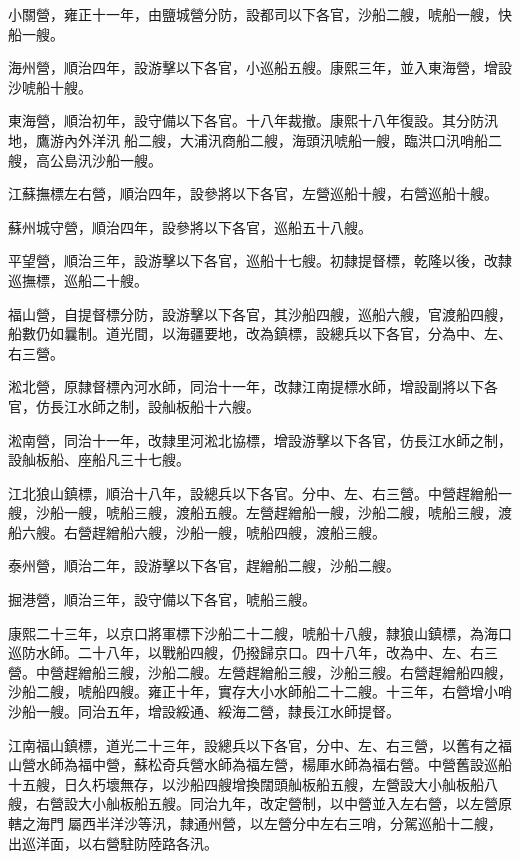 \begin{pinyinscope}
小關營，雍正十一年，由鹽城營分防，設都司以下各官，沙船二艘，唬船一艘，快船一艘。

海州營，順治四年，設游擊以下各官，小巡船五艘。康熙三年，並入東海營，增設沙唬船十艘。

東海營，順治初年，設守備以下各官。十八年裁撤。康熙十八年復設。其分防汛地，鷹游內外洋汛船二艘，大浦汛商船二艘，海頭汛唬船一艘，臨洪口汛哨船二艘，高公島汛沙船一艘。

江蘇撫標左右營，順治四年，設參將以下各官，左營巡船十艘，右營巡船十艘。

蘇州城守營，順治四年，設參將以下各官，巡船五十八艘。

平望營，順治三年，設游擊以下各官，巡船十七艘。初隸提督標，乾隆以後，改隸巡撫標，巡船二十艘。

福山營，自提督標分防，設游擊以下各官，其沙船四艘，巡船六艘，官渡船四艘，船數仍如曩制。道光間，以海疆要地，改為鎮標，設總兵以下各官，分為中、左、右三營。

淞北營，原隸督標內河水師，同治十一年，改隸江南提標水師，增設副將以下各官，仿長江水師之制，設舢板船十六艘。

淞南營，同治十一年，改隸里河淞北協標，增設游擊以下各官，仿長江水師之制，設舢板船、座船凡三十七艘。

江北狼山鎮標，順治十八年，設總兵以下各官。分中、左、右三營。中營趕繒船一艘，沙船一艘，唬船三艘，渡船五艘。左營趕繒船一艘，沙船二艘，唬船三艘，渡船六艘。右營趕繒船六艘，沙船一艘，唬船四艘，渡船三艘。

泰州營，順治二年，設游擊以下各官，趕繒船二艘，沙船二艘。

掘港營，順治三年，設守備以下各官，唬船三艘。

康熙二十三年，以京口將軍標下沙船二十二艘，唬船十八艘，隸狼山鎮標，為海口巡防水師。二十八年，以戰船四艘，仍撥歸京口。四十八年，改為中、左、右三營。中營趕繒船三艘，沙船二艘。左營趕繒船三艘，沙船三艘。右營趕繒船四艘，沙船二艘，唬船四艘。雍正十年，實存大小水師船二十二艘。十三年，右營增小哨沙船一艘。同治五年，增設綏通、綏海二營，隸長江水師提督。

江南福山鎮標，道光二十三年，設總兵以下各官，分中、左、右三營，以舊有之福山營水師為福中營，蘇松奇兵營水師為福左營，楊厙水師為福右營。中營舊設巡船十五艘，日久朽壞無存，以沙船四艘增換闊頭舢板船五艘，左營設大小舢板船八艘，右營設大小舢板船五艘。同治九年，改定營制，以中營並入左右營，以左營原轄之海門屬西半洋沙等汛，隸通州營，以左營分中左右三哨，分駕巡船十二艘，出巡洋面，以右營駐防陸路各汛。


\end{pinyinscope}
